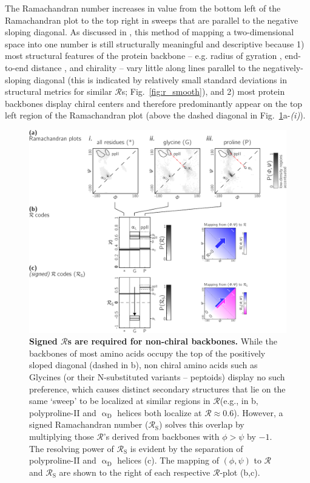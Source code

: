 \documentclass[fleqn,10pt,lineno]{wlpeerj} %
\newcommand{\Fig}[1]{Fig.~\ref{#1}}
\newcommand{\rr}{$\mathcal{R}$\xspace}
\begin{document}
The Ramachandran number increases in value from the bottom left of the Ramachandran plot to the top right in sweeps that are parallel to the negative sloping diagonal. As discussed in \cite{Mannige2016}, this method of mapping a two-dimensional space into one number is still structurally meaningful and descriptive because 1) most structural features of the protein backbone -- e.g. radius of gyration \citep{Mannige2016}, end-to-end distance \citep{Mannige2016}, and chirality \citep{Mannige2017} -- vary little along lines parallel to the negatively-sloping diagonal (this is indicated by relatively small standard deviations in structural metrics for similar {\rr}s; \Fig{fig:r_smooth}), and 2) most protein backbones display chiral centers and therefore predominantly appear on the top left region of the Ramachandran plot (above the dashed diagonal in \Fig{fig:signed}a-{\it(i)}).

\begin{figure}[t!]
\includegraphics[width=1.0\linewidth]{backmap_fig12.pdf}
\caption{\textbf{Signed {\rr}s are required for non-chiral backbones.} While the backbones of most amino acids occupy the top of the positively sloped diagonal (dashed in b), non chiral amino acids such as Glycines (or their N-substituted variants -- peptoids) display no such preference, which causes distinct secondary structures that lie on the same `sweep' to be localized at similar regions in \rr (e.g., in b, polyproline-II and $\upalpha_\textrm{D}$ helices both localize at \rr $\approx 0.6$). However, a signed Ramachandran number ($\mathcal{R}_\textrm{S}$) solves this overlap by multiplying those \rr's derived from backbones with $\phi > \psi$ by $-1$. The resolving power of $\mathcal{R}_\textrm{S}$ is evident by the separation of polyproline-II and $\upalpha_\textrm{D}$ helices (c). The mapping of $(\phi,\psi)$ to $\mathcal{R}$ and $\mathcal{R}_\textrm{S}$ are shown to the right of each respective \rr-plot (b,c).\label{fig:signed}} 
\end{figure}
\end{document}
